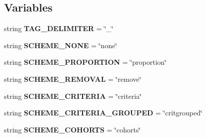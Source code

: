 \subsection*{Variables}
\begin{DoxyCompactItemize}
\item 
string {\bfseries T\+A\+G\+\_\+\+D\+E\+L\+I\+M\+I\+T\+ER} = \char`\"{}\+\_\+\char`\"{}\hypertarget{namespacenegui_1_1genepopfilesampler_a218e2f958da027b600c72bb577a3ff39}{}\label{namespacenegui_1_1genepopfilesampler_a218e2f958da027b600c72bb577a3ff39}

\item 
string {\bfseries S\+C\+H\+E\+M\+E\+\_\+\+N\+O\+NE} = \char`\"{}none\char`\"{}\hypertarget{namespacenegui_1_1genepopfilesampler_a28ebe15ea3a6144faad3f28e8ae22934}{}\label{namespacenegui_1_1genepopfilesampler_a28ebe15ea3a6144faad3f28e8ae22934}

\item 
string {\bfseries S\+C\+H\+E\+M\+E\+\_\+\+P\+R\+O\+P\+O\+R\+T\+I\+ON} = \char`\"{}proportion\char`\"{}\hypertarget{namespacenegui_1_1genepopfilesampler_a08d38d14135ba2b092e3090b0e1e74b1}{}\label{namespacenegui_1_1genepopfilesampler_a08d38d14135ba2b092e3090b0e1e74b1}

\item 
string {\bfseries S\+C\+H\+E\+M\+E\+\_\+\+R\+E\+M\+O\+V\+AL} = \char`\"{}remove\char`\"{}\hypertarget{namespacenegui_1_1genepopfilesampler_a0257c159f203d90380dfed2404ccc3a1}{}\label{namespacenegui_1_1genepopfilesampler_a0257c159f203d90380dfed2404ccc3a1}

\item 
string {\bfseries S\+C\+H\+E\+M\+E\+\_\+\+C\+R\+I\+T\+E\+R\+IA} = \char`\"{}criteria\char`\"{}\hypertarget{namespacenegui_1_1genepopfilesampler_a588f1b68f192dd6901bac76e51979419}{}\label{namespacenegui_1_1genepopfilesampler_a588f1b68f192dd6901bac76e51979419}

\item 
string {\bfseries S\+C\+H\+E\+M\+E\+\_\+\+C\+R\+I\+T\+E\+R\+I\+A\+\_\+\+G\+R\+O\+U\+P\+ED} = \char`\"{}critgrouped\char`\"{}\hypertarget{namespacenegui_1_1genepopfilesampler_ac9ebd7f9f91d41d391b71618a4cee0c7}{}\label{namespacenegui_1_1genepopfilesampler_ac9ebd7f9f91d41d391b71618a4cee0c7}

\item 
string {\bfseries S\+C\+H\+E\+M\+E\+\_\+\+C\+O\+H\+O\+R\+TS} = \char`\"{}cohorts\char`\"{}\hypertarget{namespacenegui_1_1genepopfilesampler_ac13c205986ea013af9a7b7a908529e93}{}\label{namespacenegui_1_1genepopfilesampler_ac13c205986ea013af9a7b7a908529e93}


\end{DoxyCompactItemize}
